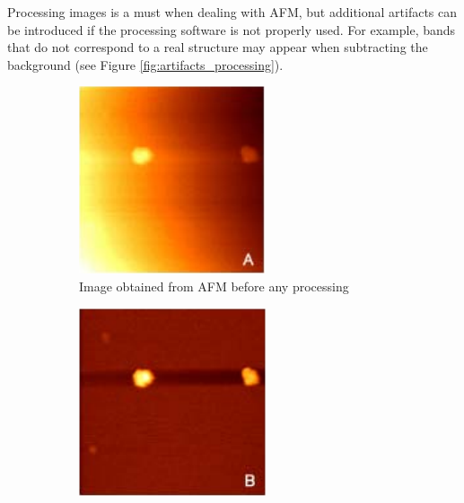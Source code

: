 \documentclass[11pt,a4paper]{article}
\begin{document}
Processing images is a must when dealing with AFM, but additional artifacts can be introduced if the processing software is not properly used. For example, bands that do not correspond to a real structure may appear when subtracting the background (see Figure \ref{fig:artifacts_processing}).

\begin{figure}[H]
\centering
\begin{subfigure}[b]{0.3\textwidth}
\includegraphics[width=\textwidth]{artifacts_processing_1}
\caption{Image obtained from AFM before any processing}
\label{fig:artifacts_processing_1}
\end{subfigure}
\begin{subfigure}[b]{0.3\textwidth}
\includegraphics[width=\textwidth]{artifacts_processing_2}

\end{subfigure}
\end{figure}
\end{document}
